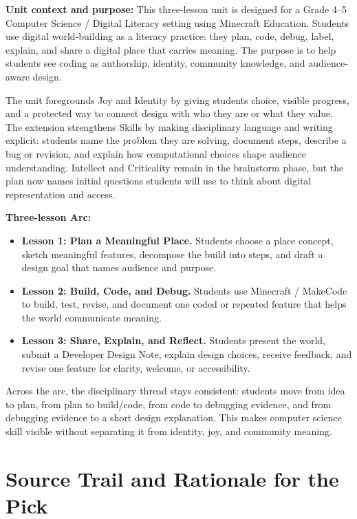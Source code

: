 \textbf{Unit context and purpose:} This three-lesson unit is designed for a Grade 4--5 Computer Science / Digital Literacy setting using Minecraft Education. Students use digital world-building as a literacy practice: they plan, code, debug, label, explain, and share a digital place that carries meaning. The purpose is to help students see coding as authorship, identity, community knowledge, and audience-aware design.

The unit foregrounds Joy and Identity by giving students choice, visible progress, and a protected way to connect design with who they are or what they value. \textcolor{LessonTwoAccent}{The extension strengthens Skills by making disciplinary language and writing explicit: students name the problem they are solving, document steps, describe a bug or revision, and explain how computational choices shape audience understanding.} Intellect and Criticality remain in the brainstorm phase, but the plan now names initial questions students will use to think about digital representation and access.

\textbf{Three-lesson Arc:}
\begin{itemize}[leftmargin=*]
    \item \textcolor{LessonOneAccent}{\textbf{Lesson 1: Plan a Meaningful Place.}} Students choose a place concept, sketch meaningful features, decompose the build into steps, and draft a design goal that names audience and purpose.
    \item \textcolor{LessonTwoAccent}{\textbf{Lesson 2: Build, Code, and Debug.}} Students use Minecraft / MakeCode to build, test, revise, and document one coded or repeated feature that helps the world communicate meaning.
    \item \textcolor{LessonThreeAccent}{\textbf{Lesson 3: Share, Explain, and Reflect.}} Students present the world, submit a Developer Design Note, explain design choices, receive feedback, and revise one feature for clarity, welcome, or accessibility.
\end{itemize}

\textcolor{LessonTwoAccent}{Across the arc, the disciplinary thread stays consistent: students move from idea to plan, from plan to build/code, from code to debugging evidence, and from debugging evidence to a short design explanation. This makes computer science skill visible without separating it from identity, joy, and community meaning.}

\newpage
\section*{Source Trail and Rationale for the Pick}

